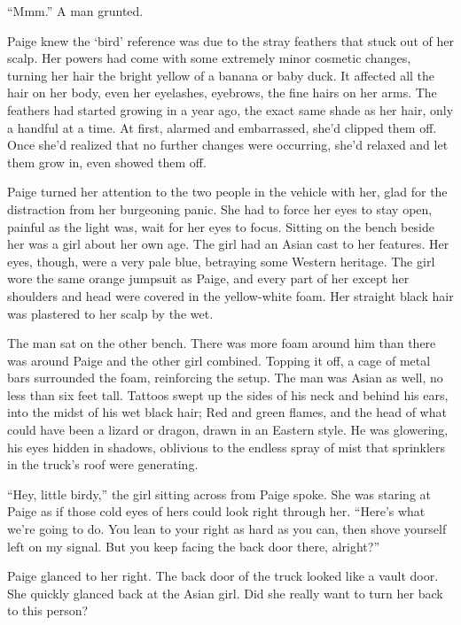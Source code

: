 ``Mmm.''  A man grunted.



Paige knew the `bird' reference was due to the stray feathers that stuck out of her scalp.  Her powers had come with some extremely minor cosmetic changes, turning her hair the bright yellow of a banana or baby duck.  It affected all the hair on her body, even her eyelashes, eyebrows, the fine hairs on her arms.  The feathers had started growing in a year ago, the exact same shade as her hair, only a handful at a time.  At first, alarmed and embarrassed, she'd clipped them off.  Once she'd realized that no further changes were occurring, she'd relaxed and let them grow in, even showed them off.



Paige turned her attention to the two people in the vehicle with her, glad for the distraction from her burgeoning panic.  She had to force her eyes to stay open, painful as the light was, wait for her eyes to focus.  Sitting on the bench beside her was a girl about her own age.  The girl had an Asian cast to her features.  Her eyes, though, were a very pale blue, betraying some Western heritage.  The girl wore the same orange jumpsuit as Paige, and every part of her except her shoulders and head were covered in the yellow-white foam.  Her straight black hair was plastered to her scalp by the wet.



The man sat on the other bench.  There was more foam around him than there was around Paige and the other girl combined.  Topping it off, a cage of metal bars surrounded the foam, reinforcing the setup.  The man was Asian as well, no less than six feet tall.  Tattoos swept up the sides of his neck and behind his ears, into the midst of his wet black hair; Red and green flames, and the head of what could have been a lizard or dragon, drawn in an Eastern style.  He was glowering, his eyes hidden in shadows, oblivious to the endless spray of mist that sprinklers in the truck's roof were generating.



``Hey, little birdy,'' the girl sitting across from Paige spoke.  She was staring at Paige as if those cold eyes of hers could look right through her.  ``Here's what we're going to do.  You lean to your right as hard as you can, then shove yourself left on my signal.  But you keep facing the back door there, alright?''



Paige glanced to her right.  The back door of the truck looked like a vault door.  She quickly glanced back at the Asian girl.  Did she really want to turn her back to this person?



